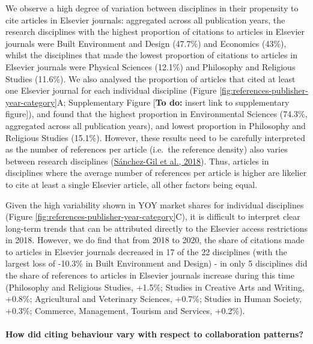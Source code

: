 \documentclass[
]{article}
\begin{document}
We observe a high degree of variation between disciplines in their propensity to cite articles in Elsevier journals: aggregated across all publication years, the research disciplines with the highest proportion of citations to articles in Elsevier journals were Built Environment and Design (47.7\%) and Economics (43\%), whilst the disciplines that made the lowest proportion of citations to articles in Elsevier journals were Physical Sciences (12.1\%) and Philosophy and Religious Studies (11.6\%). We also analysed the proportion of articles that cited at least one Elsevier journal for each individual discipline (Figure \ref{fig:references-publisher-year-category}A; Supplementary Figure {[}\textbf{To do:} insert link to supplementary figure{]}), and found that the highest proportion in Environmental Sciences (74.3\%, aggregated across all publication years), and lowest proportion in Philosophy and Religious Studies (15.1\%). However, these results need to be carefully interpreted as the number of references per article (i.e.~the reference density) also varies between research disciplines (\href{https://doi.org/10.1016/j.joi.2017.11.003}{Sánchez-Gil et al., 2018}). Thus, articles in disciplines where the average number of references per article is higher are likelier to cite at least a single Elsevier article, all other factors being equal.

Given the high variability shown in YOY market shares for individual disciplines (Figure \ref{fig:references-publisher-year-category}C), it is difficult to interpret clear long-term trends that can be attributed directly to the Elsevier access restrictions in 2018. However, we do find that from 2018 to 2020, the share of citations made to articles in Elsevier journals decreased in 17 of the 22 disciplines (with the largest loss of -10.3\% in Built Environment and Design) - in only 5 disciplines did the share of references to articles in Elsevier journals increase during this time (Philosophy and Religious Studies, +1.5\%; Studies in Creative Arts and Writing, +0.8\%; Agricultural and Veterinary Sciences, +0.7\%; Studies in Human Society, +0.3\%; Commerce, Management, Tourism and Services, +0.2\%).

\hypertarget{how-did-citing-behaviour-vary-with-respect-to-collaboration-patterns}{%
\paragraph{How did citing behaviour vary with respect to collaboration patterns?}\label{how-did-citing-behaviour-vary-with-respect-to-collaboration-patterns}}
\end{document}
